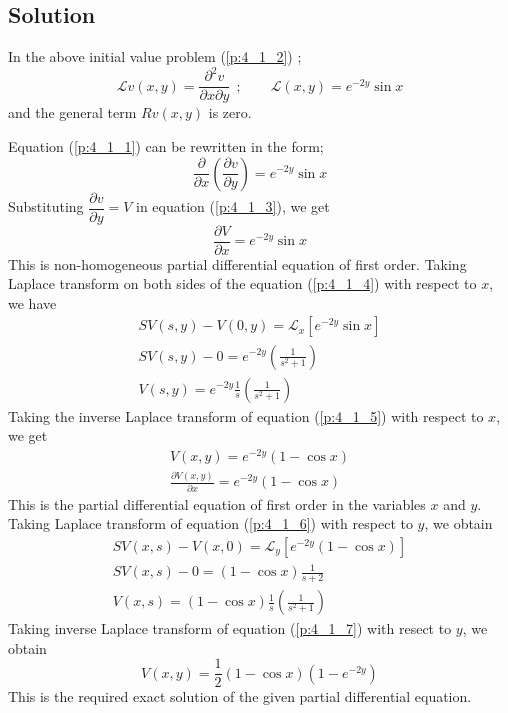 \documentclass[11pt]{report}
\newcommand{\Laplace}{\mathcal{L}}
\newcommand{\NI}{\noindent}
\newcommand{\sps}{\\[0.2cm]}
\newcommand{\dsp}{\displaystyle}
\begin{document}
	\subsection*{Solution}	
	In the above initial value problem (\ref{p:4_1_2}) ;
	\begin{equation*}
		\Laplace v(x,y) = \frac{\partial^2 v}{\partial x \partial y}~~;\qquad \Laplace(x,y)=e^{-2y}\sin x
	\end{equation*}
	and the general term $Rv(x,y)$ is zero.
	
	\NI Equation (\ref{p:4_1_1}) can be rewritten in the form;
	\begin{equation}
		\frac{\partial}{\partial x}\left(\frac{\partial v}{\partial y}\right) = e^{-2y}\sin x \label{p:4_1_3} \tag{3}
	\end{equation}
	Substituting $\dfrac{\partial v}{\partial y} = V$ in equation (\ref{p:4_1_3}), we get
	\begin{equation}
		\frac{\partial V}{\partial x}=e^{-2y}\sin x\label{p:4_1_4} \tag{4}
	\end{equation}
	This is non-homogeneous partial differential equation of first order. Taking Laplace transform on both sides of the equation (\ref{p:4_1_4}) with respect to $x$, we have
	\begin{equation}
		\begin{array}{l}
			\dsp SV(s,y) - V(0,y) = \Laplace_x\left[e^{-2y}\sin x\right]\sps
			\dsp SV(s,y) - 0 = e^{-2y}\left(\frac{1}{s^2+1}\right)\sps
			\dsp V(s,y) = e^{-2y}\frac{1}{s}\left(\frac{1}{s^2+1}\right)
		\end{array}\label{p:4_1_5} \tag{5}
	\end{equation}
	Taking the inverse Laplace transform of equation (\ref{p:4_1_5}) with respect to $x$, we get
	\begin{equation}
		\begin{array}{l}
			\dsp V(x,y) = e^{-2y}(1-\cos x)\sps
			\dsp\frac{\partial V(x,y)}{\partial x} = e^{-2y}(1-\cos x)
		\end{array}\label{p:4_1_6} \tag{6}
	\end{equation}
	This is the partial differential equation of first order in the variables $x$ and $y$.\\
	
	\NI Taking Laplace transform of equation (\ref{p:4_1_6}) with respect to $y$, we obtain
	\begin{equation}
		\begin{array}{l}
			\dsp SV(x,s)-V(x,0) = \Laplace_y\left[e^{-2y}(1-\cos x)\right]\sps
			\dsp SV(x,s) - 0 = (1-\cos x )\frac{1}{s+2}\sps
			\dsp V(x,s) = (1-\cos x)\frac{1}{s}\left(\frac{1}{s^2+1}\right)
		\end{array}
		\label{p:4_1_7} \tag{7}
	\end{equation}
	Taking inverse Laplace transform of equation (\ref{p:4_1_7}) with resect to $y$, we obtain
	\begin{equation}
		V(x,y)=\frac{1}{2}(1-\cos x)(1-e^{-2y}) \label{p:4_1_8} \tag{8}
	\end{equation}
	This is the required exact solution of the given partial differential equation.
	
\end{document}
